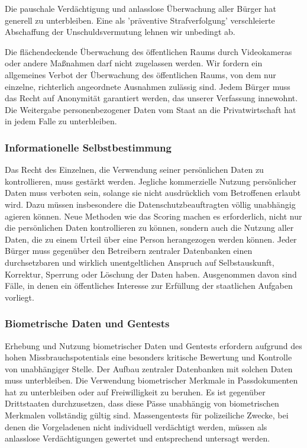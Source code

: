 Die pauschale Verdächtigung und anlasslose Überwachung aller Bürger hat generell zu unterbleiben. Eine als 'präventive Strafverfolgung' verschleierte Abschaffung der Unschuldsvermutung lehnen wir unbedingt ab.

Die flächendeckende Überwachung des öffentlichen Raums durch Videokameras oder andere Maßnahmen darf nicht zugelassen werden. Wir fordern ein allgemeines Verbot der Überwachung des öffentlichen Raums, von dem nur einzelne, richterlich angeordnete Ausnahmen zulässig sind.
Jedem Bürger muss das Recht auf Anonymität garantiert werden, das unserer Verfassung innewohnt. Die Weitergabe personenbezogener Daten vom Staat an die Privatwirtschaft hat in jedem Falle zu unterbleiben.

\subsubsection{Informationelle Selbstbestimmung}
\abstimmung
Das Recht des Einzelnen, die Verwendung seiner persönlichen Daten zu kontrollieren, muss gestärkt werden. Jegliche kommerzielle Nutzung persönlicher Daten muss verboten sein, solange sie nicht ausdrücklich vom Betroffenen erlaubt wird. Dazu müssen insbesondere die Datenschutzbeauftragten völlig unabhängig agieren können. Neue Methoden wie das Scoring machen es erforderlich, nicht nur die persönlichen Daten kontrollieren zu können, sondern auch die Nutzung aller Daten, die zu einem Urteil über eine Person herangezogen werden können. Jeder Bürger muss gegenüber den Betreibern zentraler Datenbanken einen durchsetzbaren und wirklich unentgeltlichen Anspruch auf Selbstauskunft, Korrektur, Sperrung oder Löschung der Daten haben. Ausgenommen davon sind Fälle, in denen ein öffentliches Interesse zur Erfüllung der staatlichen Aufgaben vorliegt.

\subsubsection{Biometrische Daten und Gentests}
\abstimmung
Erhebung und Nutzung biometrischer Daten und Gentests erfordern aufgrund des hohen Missbrauchspotentials eine besonders kritische Bewertung und Kontrolle von unabhängiger Stelle. Der Aufbau zentraler Datenbanken mit solchen Daten muss unterbleiben. Die Verwendung biometrischer Merkmale in Passdokumenten hat zu unterbleiben oder auf Freiwilligkeit zu beruhen. Es ist gegenüber Drittstaaten durchzusetzen, dass diese Pässe unabhängig von biometrischen Merkmalen vollständig gültig sind. Massengentests für polizeiliche Zwecke, bei denen die Vorgeladenen nicht individuell verdächtigt werden, müssen als anlasslose Verdächtigungen gewertet und entsprechend untersagt werden.

